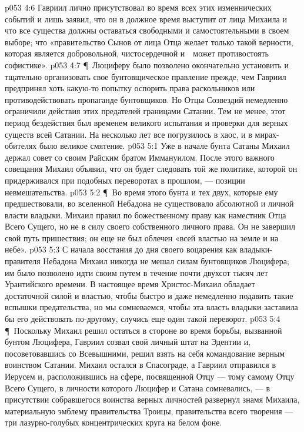 \vs p053 4:6 Гавриил лично присутствовал во время всех этих изменнических событий и лишь заявил, что он в должное время выступит от лица Михаила и что все существа должны оставаться свободными и самостоятельными в своем выборе; что «правительство Сынов от лица Отца желает только такой верности, которая является добровольной, чистосердечной и　может противостоять софистике».
\vs p053 4:7 \P\ Люциферу было позволено окончательно установить и тщательно организовать свое бунтовщическое правление прежде, чем Гавриил предпринял хоть какую\hyp{}то попытку оспорить права раскольников или противодействовать пропаганде бунтовщиков. Но Отцы Созвездий немедленно ограничили действия этих предателей границами Сатании. Тем не менее, этот период бездействия был временем великого испытания и проверки для верных существ всей Сатании. На несколько лет все погрузилось в хаос, и в мирах\hyp{}обителях было великое смятение.
\vs p053 5:1 Уже в начале бунта Сатаны Михаил держал совет со своим Райским братом Иммануилом. После этого важного совещания Михаил объявил, что он будет следовать той же политике, которой он придерживался при подобных переворотах в прошлом, --- позиции невмешательства.
\vs p053 5:2 \P\ Во время этого бунта и тех двух, которые ему предшествовали, во вселенной Небадона не существовало абсолютной и личной власти владыки. Михаил правил по божественному праву как наместник Отца Всего Сущего, но не в силу своего собственного личного права. Он не завершил свой путь пришествия; он еще не был облечен «всей властью на земле и на небе».
\vs p053 5:3 С начала восстания до дня своего воцарения как владыки\hyp{}правителя Небадона Михаил никогда не мешал силам бунтовщиков Люцифера; им было позволено идти своим путем в течение почти двухсот тысяч лет Урантийского времени. В настоящее время Христос\hyp{}Михаил обладает достаточной силой и властью, чтобы быстро и даже немедленно подавить такие вспышки предательства, но мы сомневаемся, чтобы эта власть владыки заставила бы его действовать по\hyp{}другому, случись еще один такой переворот.
\vs p053 5:4 \P\ Поскольку Михаил решил остаться в стороне во время борьбы, вызванной бунтом Люцифера, Гавриил созвал свой личный штат на Эдентии и, посоветовавшись со Всевышними, решил взять на себя командование верным воинством Сатании. Михаил остался в Спасограде, а Гавриил отправился в Иерусем и, расположившись на сфере, посвященной Отцу --- тому самому Отцу Всего Сущего, в личности которого Люцифер и Сатана сомневались, --- в присутствии собравшегося воинства верных личностей развернул знамя Михаила, материальную эмблему правительства Троицы, правительства всего творения --- три лазурно\hyp{}голубых концентрических круга на белом фоне.
